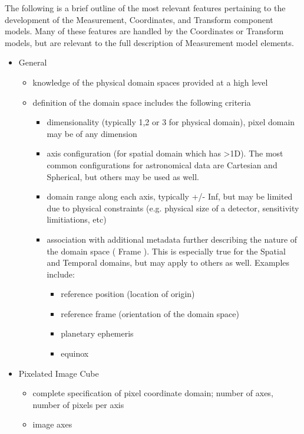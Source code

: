\documentclass[11pt,a4paper]{ivoa}
\begin{document}
  The following is a brief outline of the most relevant features pertaining to the
  development of the Measurement, Coordinates, and Transform component models.  Many 
  of these features are handled by the Coordinates or Transform models, but are 
  relevant to the full description of Measurement model elements.

  \begin{itemize}
    \item General
    \begin{itemize}
       \item knowledge of the physical domain spaces provided at a high level
       \item definition of the domain space includes the following criteria
       \begin{itemize}
          \item dimensionality (typically 1,2 or 3 for physical domain), pixel domain may be of any dimension
          \item axis configuration (for spatial domain which has >1D).  The most common configurations for astronomical data are Cartesian and Spherical, but others may be used as well.
          \item domain range along each axis, typically +/- Inf, but may be limited due to physical constraints (e.g. physical size of a detector, sensitivity limitiations, etc)
          \item association with additional metadata further describing the nature of the domain space ( Frame ).  This is especially true for the Spatial and Temporal domains, but may apply to others as well.  Examples include:
          \begin{itemize}
             \item reference position (location of origin)
             \item reference frame (orientation of the domain space)
             \item planetary ephemeris
             \item equinox
          \end{itemize}
       \end{itemize}
    \end{itemize}
    \item Pixelated Image Cube
    \begin{itemize}
       \item complete specification of pixel coordinate domain; number of axes, number of pixels per axis
       \item image axes

\end{itemize}
\end{itemize}
\end{document}
